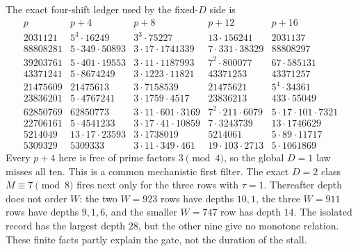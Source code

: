 \documentclass[10pt,reqno]{amsart}
\theoremstyle{definition}
\newcommand{\1}{\mathbf 1}
\begin{document}
The exact four-shift ledger used by the fixed-$D$ side is
\begingroup\scriptsize
\begin{equation}\tag{67.4}
\begin{array}{r|l|l|l|l}
p&p+4&p+8&p+12&p+16\\ \hline
2031121&5^3\cdot16249&3^3\cdot75227&13\cdot156241&2031137\\
88808281&5\cdot349\cdot50893&3\cdot17\cdot1741339&7\cdot331\cdot38329&88808297\\
39203761&5\cdot401\cdot19553&3\cdot11\cdot1187993&7^2\cdot800077&67\cdot585131\\
43371241&5\cdot8674249&3\cdot1223\cdot11821&43371253&43371257\\
21475609&21475613&3\cdot7158539&21475621&5^4\cdot34361\\
23836201&5\cdot4767241&3\cdot1759\cdot4517&23836213&433\cdot55049\\
62850769&62850773&3\cdot11\cdot601\cdot3169&7^2\cdot211\cdot6079&5\cdot17\cdot101\cdot7321\\
22706161&5\cdot4541233&3\cdot17\cdot41\cdot10859&7\cdot3243739&13\cdot1746629\\
5214049&13\cdot17\cdot23593&3\cdot1738019&5214061&5\cdot89\cdot11717\\
5309329&5309333&3\cdot11\cdot349\cdot461&19\cdot103\cdot2713&5\cdot1061869
\end{array}
\end{equation}
\endgroup
Every $p+4$ here is free of prime factors $3\pmod4$, so the global $D=1$
law misses all ten.  This is a common mechanistic first filter.  The exact
$D=2$ class $M\equiv7\pmod8$ fires next only for the three rows with
$\tau=1$.  Thereafter depth does not order $W$: the two $W=923$ rows have
depths $10,1$, the three $W=911$ rows have depths $9,1,6$, and the smaller
$W=747$ row has depth $14$.  The isolated record has the largest depth $28$,
but the other nine give no monotone relation.  These finite facts partly
explain the gate, not the duration of the stall.
\end{document}
